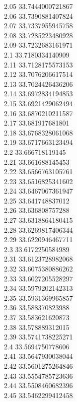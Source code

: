 {2.05	33.7444000721867\\
2.06	33.7390881407824\\
2.07	33.7337955945758\\
2.08	33.7285223480928\\
2.09	33.7232683161971\\
2.1	33.7180334140909\\
2.11	33.7128175573153\\
2.12	33.7076206617514\\
2.13	33.7024426436206\\
2.14	33.6972834194853\\
2.15	33.6921429062494\\
2.16	33.6870210211587\\
2.17	33.681917681801\\
2.18	33.6768328061068\\
2.19	33.6717663123494\\
2.2	33.666718119145\\
2.21	33.661688145453\\
2.22	33.6566763105761\\
2.23	33.6516825341602\\
2.24	33.6467067361947\\
2.25	33.641748837012\\
2.26	33.636808757288\\
2.27	33.6318864180415\\
2.28	33.6269817406344\\
2.29	33.6220946467711\\
2.3	33.6172250584989\\
2.31	33.6123728982068\\
2.32	33.6075380886262\\
2.33	33.6027205528297\\
2.34	33.5979202142313\\
2.35	33.5931369965857\\
2.36	33.588370823988\\
2.37	33.583621620873\\
2.38	33.578889312015\\
2.39	33.5741738225271\\
2.4	33.5694750778606\\
2.41	33.5647930038044\\
2.42	33.5601275264846\\
2.43	33.5554785723636\\
2.44	33.5508460682396\\
2.45	33.5462299412458\\
}
